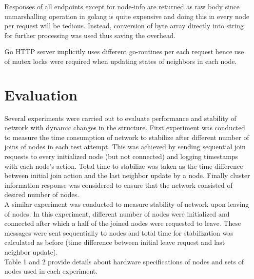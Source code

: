 \documentclass[
    a4paper,
    twocolumn,
]{article}
\begin{document}
Responses of all endpoints except for node-info are returned as raw body since unmarshalling operation in golang is quite expensive and doing this in every node per request will be tedious. Instead, conversion of byte array directly into string for further processing was used thus saving the overhead.

Go HTTP server implicitly uses different go-routines per each request hence use of mutex locks were required when updating states of neighbors in each node.

\section{Evaluation}

Several experiments were carried out to evaluate performance and stability of network with dynamic changes in the structure. First experiment was conducted to measure the time consumption of network to stabilize after different number of joins of nodes in each test attempt. This was achieved by sending sequential join requests to every initialized node (but not connected) and logging timestamps with each node's action. Total time to stabilize was taken as the time difference between initial join action and the last neighbor update by a node. Finally cluster information response was considered to ensure that the network consisted of desired number of nodes.\\

A similar experiment was conducted to measure stability of network upon leaving of nodes. In this experiment, different number of nodes were initialized and connected after which a half of the joined nodes were requested to leave. These messages were sent sequentially to nodes and total time for stabilization was calculated as before (time difference between initial leave request and last neighbor update).\\

Table 1 and 2 provide details about hardware specifications of nodes and sets of nodes used in each experiment.
\end{document}
